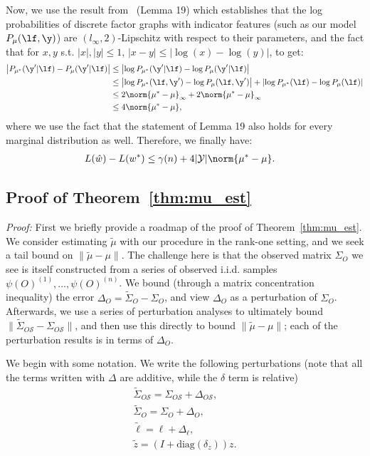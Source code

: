 \documentclass[letterpaper]{article}
\begin{document}
\begin{appendix}
Now, we use the result from~\citep{honorio2012lipschitz} (Lemma 19) which establishes that the log probabilities of discrete factor graphs with indicator features (such as our model $P_\mu(\lf,\y)$) are $(l_\infty, 2)$-Lipschitz with respect to their parameters, and the fact that for $x,y$ s.t. $|x|, |y| \leq 1$, $|x-y| \leq |\log(x)-\log(y)|$, to get:
\begin{align*}
	\left| P_{\mu^*}(\y'|\lf) - P_{\mu}(\y'|\lf) \right|
	&\leq
	\left| \log P_{\mu^*}(\y'|\lf) - \log P_{\mu}(\y'|\lf) \right|\\
	&\leq
	\left| \log P_{\mu^*}(\lf,\y') - \log P_{\mu}(\lf,\y') \right|
	+ \left|
		\log P_{\mu^*}(\lf)
		- \log P_{\mu}(\lf) \right|\\
	&\leq
	2\norm{ \mu^* - \mu }_\infty + 2\norm{ \mu^* - \mu }_\infty\\
	&\leq
	4\norm{ \mu^* - \mu },
\end{align*}
where we use the fact that the statement of Lemma 19 also holds for every marginal distribution as well.
Therefore, we finally have:
\begin{align*}
	L(\hat{w}) - L(w^*)
	&\leq
	\gamma(n)
	+ 4|\mathcal{Y}| \norm{ \mu^* - \mu }.
\end{align*}

\subsection{Proof of Theorem~\ref{thm:mu_est}}
\label{appendix:theorem-2}
\textit{Proof:} 
First we briefly provide a roadmap of the proof of Theorem~\ref{thm:mu_est}.
We consider estimating $\tilde{\mu}$ with our procedure in the rank-one setting, and we seek a tail bound on $\|\tilde{\mu} - \mu\|$.
The challenge here is that the observed matrix $\Sigma_O$ we see is itself constructed from a series of observed i.i.d. samples $\psi(O)^{(1)}, \ldots, \psi(O)^{(n)}$.
We bound (through a matrix concentration inequality) the error $\Delta_O = \tilde{\Sigma}_O - \Sigma_O$, and view $\Delta_O$ as a perturbation of $\Sigma_O$.
Afterwards, we use a series of perturbation analyses to ultimately bound $\|\tilde{\Sigma}_{O\mathcal{S}} - \Sigma_{O\mathcal{S}} \|$, and then use this directly to bound $\|\tilde{\mu} - \mu\|$; each of the perturbation results is in terms of $\Delta_O$.

We begin with some notation. We write the following perturbations (note that all the terms written with $\Delta$ are additive, while the $\delta$ term is relative)
\begin{align*}
\tilde{\Sigma}_{O\mathcal{S}} = \Sigma_{O\mathcal{S}} + \Delta_{O\mathcal{S}}, \\
\tilde{\Sigma}_O = \Sigma_O + \Delta_O, \\
\tilde{\ell} = \ell + \Delta_{\ell},\\
\tilde{z} = (I + \text{diag}(\delta_z))z.
\end{align*}


\end{appendix}
\end{document}
